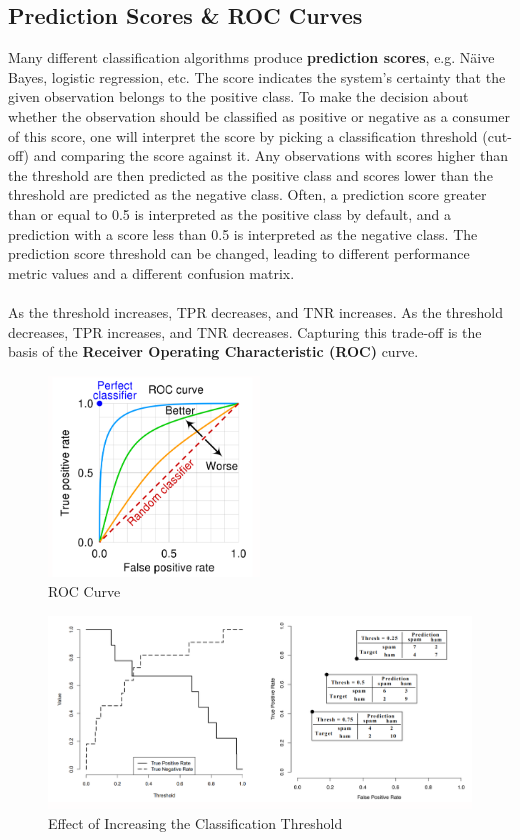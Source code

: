 \documentclass[a4paper,11pt]{article}
\begin{document}
\subsection{Prediction Scores \& ROC Curves}
Many different classification algorithms produce \textbf{prediction scores}, e.g. N\"aive Bayes, logistic regression, etc.
The score indicates the system's certainty that the given observation belongs to the positive class.
To make the decision about whether the observation should be classified as positive or negative as a consumer of this score, one will interpret the score by picking a classification threshold (cut-off) and comparing the score against it.
Any observations with scores higher than the threshold are then predicted as the positive class and scores lower than the threshold are predicted as the negative class.
Often, a prediction score greater than or equal to 0.5 is interpreted as the positive class by default, and a prediction with a score less than 0.5 is interpreted as the negative class.
The prediction score threshold can be changed, leading to different performance metric values and a different confusion matrix.
\\\\
As the threshold increases, TPR decreases, and TNR increases.
As the threshold decreases, TPR increases, and TNR decreases.
Capturing this trade-off is the basis of the \textbf{Receiver Operating Characteristic (ROC)} curve.
\begin{figure}[H]
    \centering
    \includegraphics[width=0.5\textwidth]{images/roc.png}
    \caption{ROC Curve}
\end{figure}

\begin{figure}[H]
    \centering
    \includegraphics[width=\textwidth]{images/increasingthreshold.png}
    \caption{Effect of Increasing the Classification Threshold}
\end{figure}
\end{document}
